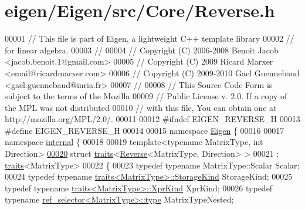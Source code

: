 \hypertarget{eigen_2_eigen_2src_2_core_2_reverse_8h_source}{}\section{eigen/\+Eigen/src/\+Core/\+Reverse.h}
\label{eigen_2_eigen_2src_2_core_2_reverse_8h_source}

\begin{DoxyCode}
00001 \textcolor{comment}{// This file is part of Eigen, a lightweight C++ template library}
00002 \textcolor{comment}{// for linear algebra.}
00003 \textcolor{comment}{//}
00004 \textcolor{comment}{// Copyright (C) 2006-2008 Benoit Jacob <jacob.benoit.1@gmail.com>}
00005 \textcolor{comment}{// Copyright (C) 2009 Ricard Marxer <email@ricardmarxer.com>}
00006 \textcolor{comment}{// Copyright (C) 2009-2010 Gael Guennebaud <gael.guennebaud@inria.fr>}
00007 \textcolor{comment}{//}
00008 \textcolor{comment}{// This Source Code Form is subject to the terms of the Mozilla}
00009 \textcolor{comment}{// Public License v. 2.0. If a copy of the MPL was not distributed}
00010 \textcolor{comment}{// with this file, You can obtain one at http://mozilla.org/MPL/2.0/.}
00011 
00012 \textcolor{preprocessor}{#ifndef EIGEN\_REVERSE\_H}
00013 \textcolor{preprocessor}{#define EIGEN\_REVERSE\_H}
00014 
00015 \textcolor{keyword}{namespace }\hyperlink{namespace_eigen}{Eigen} \{ 
00016 
00017 \textcolor{keyword}{namespace }\hyperlink{namespaceinternal}{internal} \{
00018 
00019 \textcolor{keyword}{template}<\textcolor{keyword}{typename} MatrixType, \textcolor{keywordtype}{int} Direction>
\hyperlink{struct_eigen_1_1internal_1_1traits_3_01_reverse_3_01_matrix_type_00_01_direction_01_4_01_4}{00020} \textcolor{keyword}{struct }\hyperlink{struct_eigen_1_1internal_1_1traits}{traits}<\hyperlink{group___core___module_class_eigen_1_1_reverse}{Reverse}<MatrixType, Direction> >
00021  : \hyperlink{struct_eigen_1_1internal_1_1traits}{traits}<MatrixType>
00022 \{
00023   \textcolor{keyword}{typedef} \textcolor{keyword}{typename} MatrixType::Scalar Scalar;
00024   \textcolor{keyword}{typedef} \textcolor{keyword}{typename} \hyperlink{struct_eigen_1_1internal_1_1traits}{traits<MatrixType>::StorageKind} StorageKind;
00025   \textcolor{keyword}{typedef} \textcolor{keyword}{typename} \hyperlink{struct_eigen_1_1internal_1_1traits}{traits<MatrixType>::XprKind} XprKind;
00026   \textcolor{keyword}{typedef} \textcolor{keyword}{typename} \hyperlink{struct_eigen_1_1internal_1_1ref__selector}{ref\_selector<MatrixType>::type} MatrixTypeNested;

\end{DoxyCode}
